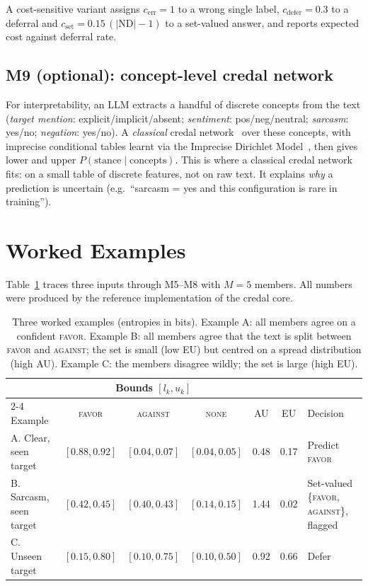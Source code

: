 \documentclass[11pt,a4paper]{article}
\newcommand{\ND}{\mathrm{ND}}
\begin{document}
A cost-sensitive variant assigns $c_{\text{err}} = 1$ to a wrong single label,
$c_{\text{defer}} = 0.3$ to a deferral and $c_{\text{set}} = 0.15\,(|\ND|-1)$ to a
set-valued answer, and reports expected cost against deferral rate.

\subsection{M9 (optional): concept-level credal network}\label{sec:m9}

For interpretability, an LLM extracts a handful of discrete concepts from the text
(\emph{target mention}: explicit/implicit/absent; \emph{sentiment}: pos/neg/neutral;
\emph{sarcasm}: yes/no; \emph{negation}: yes/no). A \emph{classical} credal
network~\cite{cozman2000} over these concepts, with imprecise conditional tables learnt via
the Imprecise Dirichlet Model~\cite{walley1996}, then gives lower and upper
$P(\text{stance} \mid \text{concepts})$. This is where a classical credal network fits:
on a small table of discrete features, not on raw text. It explains \emph{why} a prediction
is uncertain (e.g.\ ``sarcasm = yes and this configuration is rare in training'').

\section{Worked Examples}

Table~\ref{tab:examples} traces three inputs through M5--M8 with $M=5$ members. All
numbers were produced by the reference implementation of the credal core.

\begin{table}[ht]
\centering
\footnotesize
\setlength{\tabcolsep}{4pt}
\begin{tabular}{l ccc cc l}
\toprule
& \multicolumn{3}{c}{Bounds $[l_k, u_k]$} & & & \\
\cmidrule(lr){2-4}
Example & \textsc{favor} & \textsc{against} & \textsc{none} & AU & EU & Decision \\
\midrule
A. Clear, seen target & $[0.88, 0.92]$ & $[0.04, 0.07]$ & $[0.04, 0.05]$ & 0.48 & 0.17 & Predict \textsc{favor} \\
B. Sarcasm, seen target & $[0.42, 0.45]$ & $[0.40, 0.43]$ & $[0.14, 0.15]$ & 1.44 & 0.02 & Set-valued \{\textsc{favor}, \textsc{against}\}, flagged \\
C. Unseen target & $[0.15, 0.80]$ & $[0.10, 0.75]$ & $[0.10, 0.50]$ & 0.92 & 0.66 & Defer \\
\bottomrule
\end{tabular}
\caption{Three worked examples (entropies in bits). Example A: all members agree on a
confident \textsc{favor}. Example B: all members agree that the text is split between
\textsc{favor} and \textsc{against}; the set is small (low EU) but centred on a spread
distribution (high AU). Example C: the members disagree wildly; the set is large (high EU).}
\label{tab:examples}
\end{table}
\end{document}

